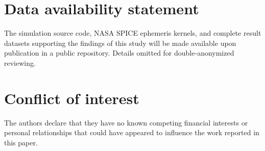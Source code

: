 \documentclass[a4paper,fleqn]{cas-dc}
\begin{document}
\section*{Data availability statement}
The simulation source code, NASA SPICE ephemeris kernels, and complete result datasets supporting the findings of this study will be made available upon publication in a public repository. Details omitted for double-anonymized reviewing.

\section*{Conflict of interest}
The authors declare that they have no known competing financial interests or personal relationships that could have appeared to influence the work reported in this paper.



\end{document}
